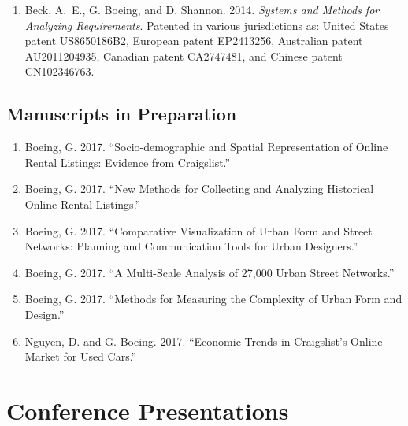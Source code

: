 \documentclass[11pt,letterpaper]{report}
\begin{document}
\begin{enumerate}[resume]

\item Beck, A.~E., G. Boeing, and D. Shannon. 2014. \emph{Systems and Methods for Analyzing Requirements}. Patented in various jurisdictions as: United States patent US8650186B2, European patent EP2413256, Australian patent AU2011204935, Canadian patent CA2747481, and Chinese patent CN102346763.

\end{enumerate}



\subsection*{Manuscripts in Preparation}

\begin{enumerate}[resume]

\item Boeing, G. 2017. \enquote{Socio-demographic and Spatial Representation of Online Rental Listings: Evidence from Craigslist.}

\item Boeing, G. 2017. \enquote{New Methods for Collecting and Analyzing Historical Online Rental Listings.}

\item Boeing, G. 2017. \enquote{Comparative Visualization of Urban Form and Street Networks: Planning and Communication Tools for Urban Designers.}

\item Boeing, G. 2017. \enquote{A Multi-Scale Analysis of 27,000 Urban Street Networks.}

\item Boeing, G. 2017. \enquote{Methods for Measuring the Complexity of Urban Form and Design.}

\item Nguyen, D. and G. Boeing. 2017. \enquote{Economic Trends in Craigslist's Online Market for Used Cars.}

\end{enumerate}



\section*{Conference Presentations}
\end{document}
